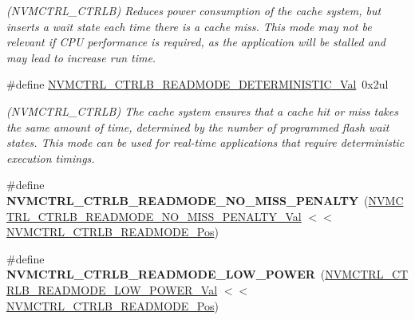 \begin{DoxyCompactItemize}
\begin{DoxyCompactList}\small\item\em (N\+V\+M\+C\+T\+R\+L\+\_\+\+C\+T\+R\+L\+B) Reduces power consumption of the cache system, but inserts a wait state each time there is a cache miss. This mode may not be relevant if C\+P\+U performance is required, as the application will be stalled and may lead to increase run time. \end{DoxyCompactList}\item 
\hypertarget{group___s_a_m_l21___n_v_m_c_t_r_l_ga330c07f70cd004957ce3ab80e77f06d8}{}\#define \hyperlink{group___s_a_m_l21___n_v_m_c_t_r_l_ga330c07f70cd004957ce3ab80e77f06d8}{N\+V\+M\+C\+T\+R\+L\+\_\+\+C\+T\+R\+L\+B\+\_\+\+R\+E\+A\+D\+M\+O\+D\+E\+\_\+\+D\+E\+T\+E\+R\+M\+I\+N\+I\+S\+T\+I\+C\+\_\+\+Val}~0x2ul\label{group___s_a_m_l21___n_v_m_c_t_r_l_ga330c07f70cd004957ce3ab80e77f06d8}

\begin{DoxyCompactList}\small\item\em (N\+V\+M\+C\+T\+R\+L\+\_\+\+C\+T\+R\+L\+B) The cache system ensures that a cache hit or miss takes the same amount of time, determined by the number of programmed flash wait states. This mode can be used for real-\/time applications that require deterministic execution timings. \end{DoxyCompactList}\item 
\hypertarget{group___s_a_m_l21___n_v_m_c_t_r_l_ga566f1952886163d66be5acb1d632646c}{}\#define {\bfseries N\+V\+M\+C\+T\+R\+L\+\_\+\+C\+T\+R\+L\+B\+\_\+\+R\+E\+A\+D\+M\+O\+D\+E\+\_\+\+N\+O\+\_\+\+M\+I\+S\+S\+\_\+\+P\+E\+N\+A\+L\+T\+Y}~(\hyperlink{group___s_a_m_l21___n_v_m_c_t_r_l_ga4a4b96f2109c47245bc98e69b66fff74}{N\+V\+M\+C\+T\+R\+L\+\_\+\+C\+T\+R\+L\+B\+\_\+\+R\+E\+A\+D\+M\+O\+D\+E\+\_\+\+N\+O\+\_\+\+M\+I\+S\+S\+\_\+\+P\+E\+N\+A\+L\+T\+Y\+\_\+\+Val} $<$$<$ \hyperlink{group___s_a_m_l21___n_v_m_c_t_r_l_ga46b5014db97bf5ce4da54dce52d162f9}{N\+V\+M\+C\+T\+R\+L\+\_\+\+C\+T\+R\+L\+B\+\_\+\+R\+E\+A\+D\+M\+O\+D\+E\+\_\+\+Pos})\label{group___s_a_m_l21___n_v_m_c_t_r_l_ga566f1952886163d66be5acb1d632646c}

\item 
\hypertarget{group___s_a_m_l21___n_v_m_c_t_r_l_gad68c23f250b571ae61e8c9ad730b42a4}{}\#define {\bfseries N\+V\+M\+C\+T\+R\+L\+\_\+\+C\+T\+R\+L\+B\+\_\+\+R\+E\+A\+D\+M\+O\+D\+E\+\_\+\+L\+O\+W\+\_\+\+P\+O\+W\+E\+R}~(\hyperlink{group___s_a_m_l21___n_v_m_c_t_r_l_gaa992cf03ba51b466d0e1f18fba2982d2}{N\+V\+M\+C\+T\+R\+L\+\_\+\+C\+T\+R\+L\+B\+\_\+\+R\+E\+A\+D\+M\+O\+D\+E\+\_\+\+L\+O\+W\+\_\+\+P\+O\+W\+E\+R\+\_\+\+Val} $<$$<$ \hyperlink{group___s_a_m_l21___n_v_m_c_t_r_l_ga46b5014db97bf5ce4da54dce52d162f9}{N\+V\+M\+C\+T\+R\+L\+\_\+\+C\+T\+R\+L\+B\+\_\+\+R\+E\+A\+D\+M\+O\+D\+E\+\_\+\+Pos})\label{group___s_a_m_l21___n_v_m_c_t_r_l_gad68c23f250b571ae61e8c9ad730b42a4}


\end{DoxyCompactItemize}
